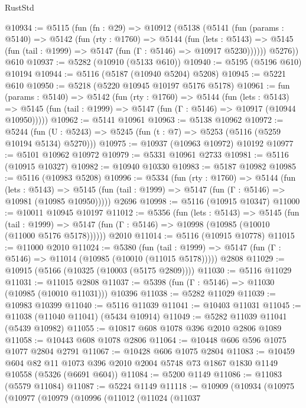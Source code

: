 \begin{lexlean}{RustStd}
\begin{coremodule}
@10934 := @5115
    (fun (fn : @29) =>
    @10912
      (@5138
        (@5141
          (fun (params : @5140) =>
          @5142
            (fun (rty : @1760) =>
            @5144
              (fun (lets : @5143) =>
              @5145 (fun (tail : @1999) => @5147 (fun (Γ : @5146) => @10917 @5230))))))
        @5276))
    @610
@10937 := @5282 (@10910 (@5133 @610))
@10940 := @5195 (@5196 @610) @10194
@10944 := @5116 (@5187 (@10940 @5204) @5208)
@10945 := @5221 @610
@10950 := @5218 (@5220 @10945 @10197 @5176 @5178)
@10961 := fun (params : @5140) =>
  @5142
    (fun (rty : @1760) =>
    @5144
      (fun (lets : @5143) =>
      @5145 (fun (tail : @1999) => @5147 (fun (Γ : @5146) => @10917 (@10944 @10950)))))
@10962 := @5141 @10961
@10963 := @5138 @10962
@10972 := @5244
    (fun (U : @5243) => @5245 (fun (t : @7) => @5253 (@5116 (@5259 @10194 @5134) @5270)))
@10975 := @10937 (@10963 @10972) @10192
@10977 := @5101 @10962 @10972
@10979 := @5331 @10961 @2733
@10981 := @5116 (@10915 @10327)
@10982 := @10940 @10330
@10983 := @5187 @10982
@10985 := @5116 (@10983 @5208)
@10996 := @5334
    (fun (rty : @1760) =>
    @5144
      (fun (lets : @5143) =>
      @5145 (fun (tail : @1999) => @5147 (fun (Γ : @5146) => @10981 (@10985 @10950)))))
    @2696
@10998 := @5116 (@10915 @10347)
@11000 := @10011 @10945 @10197
@11012 := @5356
    (fun (lets : @5143) =>
    @5145
      (fun (tail : @1999) =>
      @5147 (fun (Γ : @5146) => @10998 (@10985 (@10010 (@11000 @5176 @5178))))))
    @2010
@11014 := @5116 (@10915 @10778)
@11015 := @11000 @2010
@11024 := @5380
    (fun (tail : @1999) => @5147 (fun (Γ : @5146) => @11014 (@10985 (@10010 (@11015 @5178)))))
    @2808
@11029 := @10915 (@5166 (@10325 (@10003 (@5175 @2809))))
@11030 := @5116 @11029
@11031 := @11015 @2808
@11037 := @5398 (fun (Γ : @5146) => @11030 (@10985 (@10010 @11031))) @10396
@11038 := @5282 @11029
@11039 := @10983 @10399
@11040 := @5116 @11039
@11041 := @10403 @11031
@11045 := @11038 (@11040 @11041) (@5434 @10914)
@11049 := @5282 @11039 @11041 (@5439 @10982)
@11055 := @10817 @608 @1078 @396 @2010 @2806 @1089
@11058 := @10443 @608 @1078 @2806
@11064 := @10448 @606 @596 @1075 @1077 @2804 @2791
@11067 := @10428 @606 @1075 @2804
@11083 := @10459
    @604
    @82
    @11
    @1073
    @396
    @2010
    @2004
    @5748
    @73
    @1867
    @1830
    @1149
    @10558
    (@5326 (@6691 @604))
@11084 := @5200 @1149
@11086 := @11083 (@5579 @11084)
@11087 := @5224 @1149
@11118 := @10909
    (@10934
      (@10975
        (@10977
          (@10979
            (@10996
              (@11012
                (@11024
                  (@11037

\end{coremodule}
\end{lexlean}
